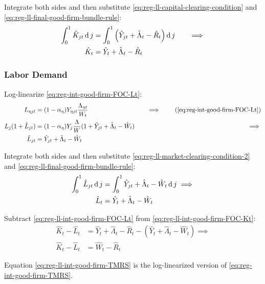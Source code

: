 \documentclass[
	thesis.tex
	]{subfiles}
\begin{document}
Integrate both sides and then substitute \ref{eq:reg-ll-capital-clearing-condition} and \ref{eq:reg-ll-final-good-firm-bundle-rule}:
\begin{alignat}{2}
	\int_{0}^{1} \hat{K}_{jt} \operatorname{d} j &= \int_{0}^{1} \left( \hat{Y}_{jt} + \hat{\Lambda}_t - \hat{R}_t \right) \operatorname{d} j \quad &\implies \nonumber \\
	\hat{K}_t &= \hat{Y}_t + \hat{\Lambda}_t - \hat{R}_t \label{eq:reg-ll-int-good-firm-FOC-Kt}
\end{alignat}


\subsubsection{Labor Demand}

Log-linearize \ref{eq:reg-int-good-firm-FOC-Lt}:
\begin{alignat}{2}
	L_{\eta jt} &= (1-{\alpha_\eta}) Y_{\eta jt} \frac{\Lambda_{\eta t}}{W_t} &\implies \tag{\ref{eq:reg-int-good-firm-FOC-Lt}} \\
	L_j (1+ \hat{L}_{jt}) &= (1-{\alpha_\eta}) Y_{j} \frac{\Lambda}{W} (1+ \hat{Y}_{jt} +\hat{\Lambda}_t -\hat{W}_t) \quad &\implies \nonumber \\
	\hat{L}_{jt} &= \hat{Y}_{jt} +\hat{\Lambda}_t -\hat{W}_t \nonumber
\end{alignat}

Integrate both sides and then substitute \ref{eq:reg-ll-market-clearing-condition-2} and \ref{eq:reg-ll-final-good-firm-bundle-rule}:
\begin{align}
	\int_{0}^{1} \hat{L}_{jt} \operatorname{d} j &= \int_{0}^{1} \hat{Y}_{jt} + \hat{\Lambda}_t - \hat{W}_t \operatorname{d} j \implies \nonumber \\
	\hat{L}_t &= \hat{Y}_t + \hat{\Lambda}_t - \hat{W}_t
	\label{eq:reg-ll-int-good-firm-FOC-Lt}
\end{align}

Subtract \ref{eq:reg-ll-int-good-firm-FOC-Lt} from \ref{eq:reg-ll-int-good-firm-FOC-Kt}:
\begin{align}
	\hat{K}_t - \hat{L}_t &= \hat{Y}_t + \hat{\Lambda}_t - \hat{R}_t - (\hat{Y}_t + \hat{\Lambda}_t - \hat{W}_t) \implies \nonumber \\
	\hat{K}_t - \hat{L}_t &= \hat{W}_t - \hat{R}_t \label{eq:reg-ll-int-good-firm-TMRS}
\end{align}

Equation \ref{eq:reg-ll-int-good-firm-TMRS} is the log-linearized version of \ref{eq:reg-int-good-firm-TMRS}.
\end{document}

